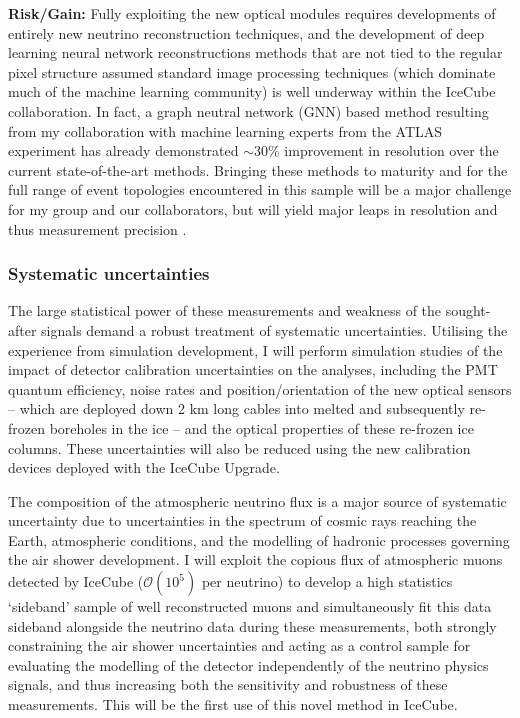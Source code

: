 \documentclass[a4paper,11pt]{article}
\begin{document}
\textbf{Risk/Gain:} Fully exploiting the new optical modules requires developments of entirely new neutrino reconstruction techniques, and the development of deep learning neural network reconstructions methods that are not tied to the regular pixel structure assumed standard image processing techniques (which dominate much of the machine learning community) is well underway within the IceCube collaboration. In fact, a graph neutral network (GNN) based method resulting from my collaboration with machine learning experts from the ATLAS experiment has already demonstrated $\sim$30\% improvement in resolution over the current state-of-the-art methods. Bringing these methods to maturity and for the full range of event topologies encountered in this sample will be a major challenge for my group and our collaborators, but will yield major leaps in resolution and thus measurement precision . \\



\subsubsection{Systematic uncertainties}

The large statistical power of these measurements and weakness of the sought-after signals demand a robust treatment of systematic uncertainties. Utilising the experience from simulation development, I will perform simulation studies of the impact of detector calibration uncertainties on the analyses, including the PMT quantum efficiency, noise rates and position/orientation of the new optical sensors -- which are deployed down 2 km long cables into melted and subsequently re-frozen boreholes in the ice -- and the optical properties of these re-frozen ice columns. These uncertainties will also be reduced using the new calibration devices deployed with the IceCube Upgrade.

The composition of the atmospheric neutrino flux is a major source of systematic uncertainty due to uncertainties in the spectrum of cosmic rays reaching the Earth, atmospheric conditions, and the modelling of hadronic processes governing the air shower development. I will exploit the copious flux of atmospheric muons detected by IceCube ($\mathcal{O}(10^5)$ per neutrino) to develop a high statistics `sideband' sample of well reconstructed muons and simultaneously fit this data sideband alongside the neutrino data during these measurements, both strongly constraining the air shower uncertainties and acting as a control sample for evaluating the modelling of the detector independently of the neutrino physics signals, and thus increasing both the sensitivity and robustness of these measurements. This will be the first use of this novel method in IceCube. \\
\end{document}
